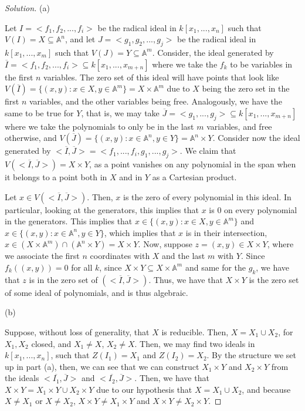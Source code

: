 \documentclass[10pt]{article}
\begin{document}
\begin{proof}[Solution]

(a)

Let $I = <f_1, f_2,...,f_i>$ be the radical ideal in $k[x_1,...,x_n]$ such that $V(I) = X \subseteq \mathbb{A}^n$, and let $J = < g_1,g_2,...,g_j>$ be the radical ideal in $k[x_1,...,x_m]$ such that $V(J) = Y \subseteq \mathbb{A}^m$. Consider, the ideal generated by $\overline{I} = <f_1, f_2,...,f_i>\subseteq k[x_1,...,x_{m+n}]$ where we take the $f_k$ to be variables in the first $n$ variables. The zero set of this ideal will have points that look like $V(\overline{I}) = \{ (x,y) : x \in X, y \in \mathbb{A}^m \} = X \times \mathbb{A}^m$ due to $X$ being the zero set in the first $n$ variables, and the other variables being free. Analogously, we have the same to be true for $Y$, that is, we may take $\overline{J} = <g_1,...,g_j> \subseteq k[x_1,...,x_{m+n}]$ where we take the polynomials to only be in the last $m$ variables, and free otherwise, and $V(\overline{J}) = \{ (x,y) : x \in \mathbb{A}^n, y \in Y \} = \mathbb{A}^n \times Y$. Consider now the ideal generated by $<\overline{I}, \overline{J} >  = < f_1,...,f_i, g_1,...,g_j>$. We claim that $V(<\overline{I}, \overline{J} >)  = X \times Y$, as a point vanishes on any polynomial in the span when it belongs to a point both in $X$ and in $Y$ as a Cartesian product.

Let $x \in V(<\overline{I}, \overline{J} >)$. Then, $x$ is the zero of every polynomial in this ideal. In particular, looking at the generators, this implies that $x$ is 0 on every polynomial in the generators. This implies that $x \in \{ (x,y) : x \in X, y \in \mathbb{A}^m \}$ and $x \in  \{ (x,y) : x \in \mathbb{A}^n, y \in Y \} $, which implies that $x$ is in their intersection, $x \in ( X \times \mathbb{A}^m) \cap (\mathbb{A}^n \times Y) = X \times Y$. Now, suppose $z = (x,y) \in X \times Y$, where we associate the first $n$ coordinates with $X$ and the last $m$ with $Y$. Since $f_k((x,y)) = 0$ for all $k$, since $X \times Y \subseteq X \times \mathbb{A}^m$ and same for the $g_k$, we have that $z$ is in the zero set of $(<\overline{I}, \overline{J} >)$. Thus, we have that $X \times Y$ is the zero set of some ideal of polynomials, and is thus algebraic.

(b)

Suppose, without loss of generality, that $X$ is reducible. Then, $ X = X_1 \cup X_2$, for $X_1, X_2$ closed, and $X_1 \not = X$, $X_2 \not = X$. Then, we may find two ideals in $k[x_1,...,x_n]$, such that $Z(I_1) = X_1$ and $Z(I_2) = X_2$. By the structure we set up in part (a), then, we can see that we can construct $X_1 \times Y$ and $X_2 \times Y$ from the ideals $< \overline{I_1}, \overline{J} >$ and $< \overline{I_2}, \overline{J} >$. Then, we have that $X \times Y = X_1 \times Y \cup X_2 \times Y$ due to our hypothesis that $X = X_1 \cup X_2$, and because $X \not = X_1$ or $X \not = X_2$, $X \times Y \not = X_1 \times Y$ and  $X \times Y \not = X_2 \times Y$.


\end{proof}
\end{document}
